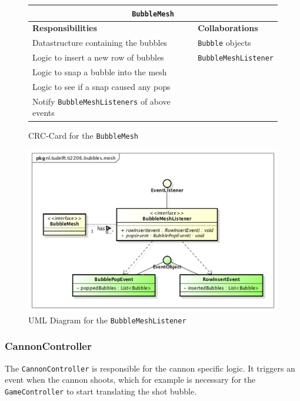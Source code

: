 \documentclass[a4paper]{article}
\begin{document}
\begin{figure}[H]
    \begin{center}
    \begin{tabular}{ | p{8cm} | p{4cm} | }
      \multicolumn{2}{c}{\texttt{BubbleMesh}} \\ \hline
      \textbf{Responsibilities} & \textbf{Collaborations} \\ \hline
      Datastructure containing the bubbles & \texttt{Bubble} objects \\
      Logic to insert a new row of bubbles & \texttt{BubbleMeshListener} \\
      Logic to snap a bubble into the mesh & \\
      Logic to see if a snap caused any pops & \\
      Notify \texttt{BubbleMeshListeners} of above events & \\
      \hline
    \end{tabular}
    \end{center}
    \caption{CRC-Card for the \texttt{BubbleMesh}}
\end{figure}

\begin{figure}[H]
    \centering
	\includegraphics[scale=0.5]{BubbleMeshListener.png}
    \caption{UML Diagram for the \texttt{BubbleMeshListener}}
\end{figure}


\subsubsection*{CannonController}
The \texttt{CannonController} is responsible for the cannon specific logic. It triggers an event when the cannon shoots, which for example is necessary for the \texttt{GameController} to start translating the shot bubble.
\end{document}
